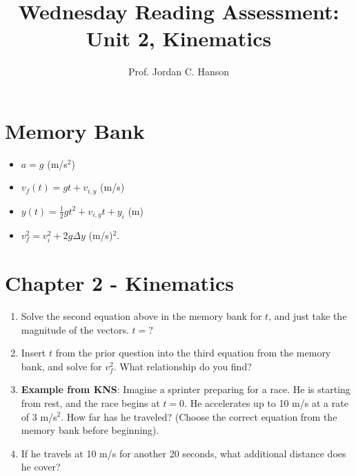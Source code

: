 \documentclass{article}
\begin{document}
\title{Wednesday Reading Assessment: Unit 2, Kinematics}
\author{Prof. Jordan C. Hanson}

\maketitle

\section{Memory Bank}

\begin{itemize}
\item $a = g$ (m/s$^2$)
\item $v_f(t) = gt + v_{i,y}$ (m/s)
\item $y(t) = \frac{1}{2}gt^2 + v_{i,y} t + y_{i}$ (m)
\item $v_f^2 = v_i^2 + 2g\Delta y$ (m/s)$^2$.
\end{itemize}

\section{Chapter 2 - Kinematics}

\begin{enumerate}
\item Solve the second equation above in the memory bank for $t$, and just take the magnitude of the vectors. $t=?$ \\ \vspace{3cm}
\item Insert $t$ from the prior question into the third equation from the memory bank, and solve for $v_f^2$.  What relationship do you find? \\ \vspace{4cm}
\item \textbf{Example from KNS}: Imagine a sprinter preparing for a race.  He is starting from rest, and the race begins at $t=0$.  He accelerates up to 10 m/s at a rate of 3 m/s$^2$.  How far has he traveled? (Choose the correct equation from the memory bank before beginning). \\ \vspace{3cm}
\item If he travels at 10 m/s for another 20 seconds, what additional distance does he cover?
\end{enumerate}
\end{document}
